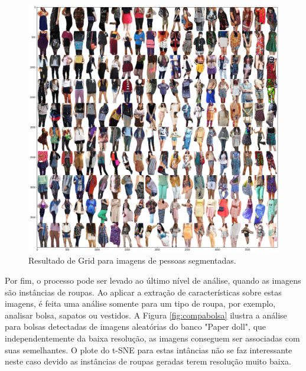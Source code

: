 \documentclass[12pt]{report}
\begin{document}
\begin{figure}
    \centering
    \includegraphics[scale=0.4]{images/resultados/rast2.png}
    \caption{Resultado de Grid para imagens de pessoas segmentadas.}
    \label{fig:rast2}
\end{figure}

Por fim, o processo pode ser levado ao último nível de análise, quando as imagens são instâncias de roupas. Ao aplicar a extração de características sobre estas imagens, é feita uma análise somente para um tipo de roupa, por exemplo, analisar bolsa, sapatos ou vestidos. A Figura \ref{fig:compabolsa} ilustra a análise para bolsas detectadas de imagens aleatórias do banco "Paper doll", que independentemente da baixa resolução, as imagens conseguem ser associadas com suas semelhantes. O plote do t-SNE para estas intâncias não se faz interessante neste caso devido as instâncias de roupas geradas terem resolução muito baixa. 
\end{document}
